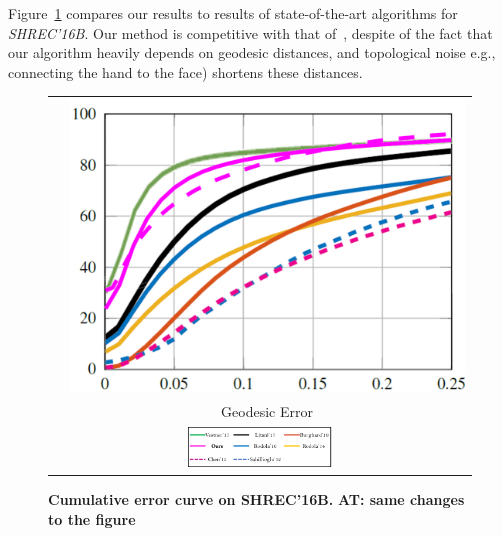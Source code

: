 \documentclass[10pt,twocolumn,letterpaper]{article}
\newcommand{\colornote}[3]{{\color{#1}\bf{#2: #3}\normalfont}}
\newcommand{\colornote}[3]{}
\newcommand {\ayellet}[1]{\colornote{blue}{AT}{#1}}
\begin{document}
Figure~\ref{fig:Shrec16Top} compares our results to results of state-of-the-art algorithms for {\em SHREC'16B}.
Our method is competitive with that of~\cite{vestner2017efficient}, despite of the fact that our algorithm heavily depends on geodesic distances, and topological noise e.g., connecting the hand to the face) shortens these distances.

\begin{figure}[htb]

	\centering
\setlength\tabcolsep{0.5pt}
\begin{tabular}{cc}
	\rotatebox{90}{    \, \% Correspondences} &
	\includegraphics[scale=0.3]{figures/SHREC16BCummulative.png}\\
	& Geodesic Error \\
		\multicolumn{2}{c}{\includegraphics[width=0.35\textwidth]{figures/SHREC16Bmethods.png}}
\end{tabular}
	\caption{{\bf Cumulative error curve on SHREC'16B.} \ayellet{same changes to the figure}}
		\label{fig:Shrec16Top}
\end{figure}
\end{document}
